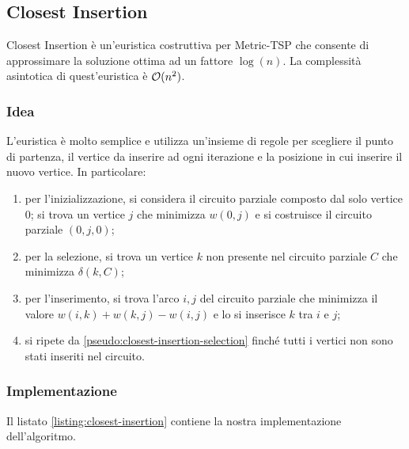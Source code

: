 \newpage

\subsection{Closest Insertion}
\label{sec:closest-insertion}

Closest Insertion è un'euristica costruttiva per Metric-TSP che
consente di approssimare la soluzione ottima ad un fattore
$\log(n)$. La complessità asintotica di quest'euristica è
$\mathcal{O}(n^2)$.

\subsubsection{Idea}

L'euristica è molto semplice e utilizza un'insieme di regole per
scegliere il punto di partenza, il vertice da inserire ad ogni
iterazione e la posizione in cui inserire il nuovo vertice. In
particolare:

\begin{enumerate}
    \item per l'inizializzazione, si considera il circuito parziale composto
      dal solo vertice $0$; si trova un vertice $j$ che minimizza $w(0,
      j)$ e si costruisce il circuito parziale $(0, j,0)$;
    \item per la selezione, si trova un vertice $k$ non presente nel circuito
      parziale $C$ che minimizza $\delta(k,C)$;
    \label{pseudo:closest-insertion-selection}
    \item per l'inserimento, si trova l’arco ${i, j}$ del circuito parziale che
      minimizza il valore $w(i, k) + w(k, j) - w(i, j)$ e lo si inserisce
      $k$ tra $i$ e $j$;
    \item si ripete da \ref{pseudo:closest-insertion-selection} finché
tutti i vertici non sono stati inseriti nel circuito.
\end{enumerate}

\subsubsection{Implementazione}

\noindent Il listato \ref{listing:closest-insertion} contiene la
nostra implementazione dell'algoritmo.

